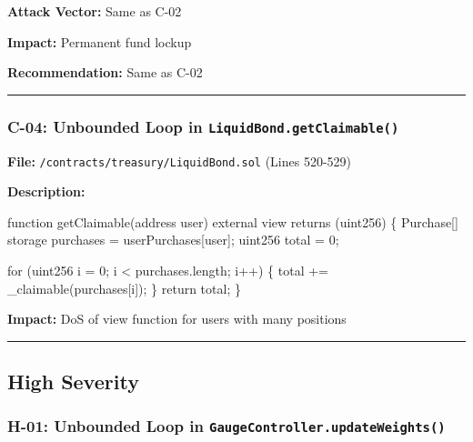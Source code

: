 \documentclass[
]{article}
\newenvironment{Shaded}{}{}
\newcommand{\NormalTok}[1]{#1}
\begin{document}
\textbf{Attack Vector:} Same as C-02

\textbf{Impact:} Permanent fund lockup

\textbf{Recommendation:} Same as C-02

\begin{center}\rule{0.5\linewidth}{0.5pt}\end{center}

\subsubsection{\texorpdfstring{C-04: Unbounded Loop in
\texttt{LiquidBond.getClaimable()}}{C-04: Unbounded Loop in LiquidBond.getClaimable()}}\label{c-04-unbounded-loop-in-liquidbondgetclaimable}

\textbf{File:} \texttt{/contracts/treasury/LiquidBond.sol} (Lines
520-529)

\textbf{Description:}

\begin{Shaded}
\begin{Highlighting}[]
\NormalTok{function getClaimable(address user) external view returns (uint256) \{}
\NormalTok{    Purchase[] storage purchases = userPurchases[user];}
\NormalTok{    uint256 total = 0;}

\NormalTok{    for (uint256 i = 0; i \textless{} purchases.length; i++) \{}
\NormalTok{        total += \_claimable(purchases[i]);}
\NormalTok{    \}}
\NormalTok{    return total;}
\NormalTok{\}}
\end{Highlighting}
\end{Shaded}

\textbf{Impact:} DoS of view function for users with many positions

\begin{center}\rule{0.5\linewidth}{0.5pt}\end{center}

\subsection{High Severity}\label{high-severity}

\subsubsection{\texorpdfstring{H-01: Unbounded Loop in
\texttt{GaugeController.updateWeights()}}{H-01: Unbounded Loop in GaugeController.updateWeights()}}\label{h-01-unbounded-loop-in-gaugecontrollerupdateweights}
\end{document}
